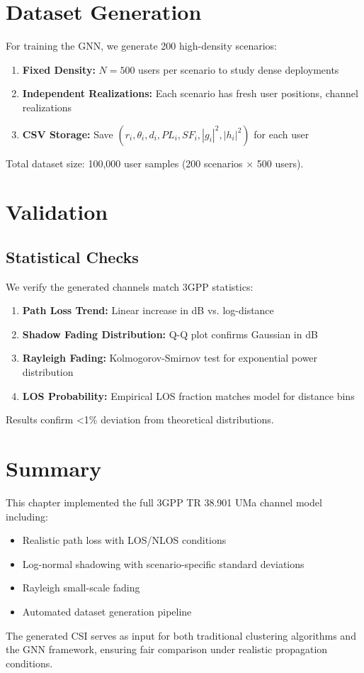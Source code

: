 \section{Dataset Generation}

For training the GNN, we generate 200 high-density scenarios:

\begin{enumerate}
    \item \textbf{Fixed Density:} $N = 500$ users per scenario to study dense deployments
    \item \textbf{Independent Realizations:} Each scenario has fresh user positions, channel realizations
    \item \textbf{CSV Storage:} Save $(r_i, \theta_i, d_i, PL_i, SF_i, |g_i|^2, |h_i|^2)$ for each user
\end{enumerate}

Total dataset size: 100,000 user samples (200 scenarios × 500 users).

\section{Validation}

\subsection{Statistical Checks}

We verify the generated channels match 3GPP statistics:

\begin{enumerate}
    \item \textbf{Path Loss Trend:} Linear increase in dB vs. log-distance
    \item \textbf{Shadow Fading Distribution:} Q-Q plot confirms Gaussian in dB
    \item \textbf{Rayleigh Fading:} Kolmogorov-Smirnov test for exponential power distribution
    \item \textbf{LOS Probability:} Empirical LOS fraction matches model for distance bins
\end{enumerate}

Results confirm <1\% deviation from theoretical distributions.

\section{Summary}

This chapter implemented the full 3GPP TR 38.901 UMa channel model including:
\begin{itemize}
    \item Realistic path loss with LOS/NLOS conditions
    \item Log-normal shadowing with scenario-specific standard deviations
    \item Rayleigh small-scale fading
    \item Automated dataset generation pipeline
\end{itemize}

The generated CSI serves as input for both traditional clustering algorithms and the GNN framework, ensuring fair comparison under realistic propagation conditions.
